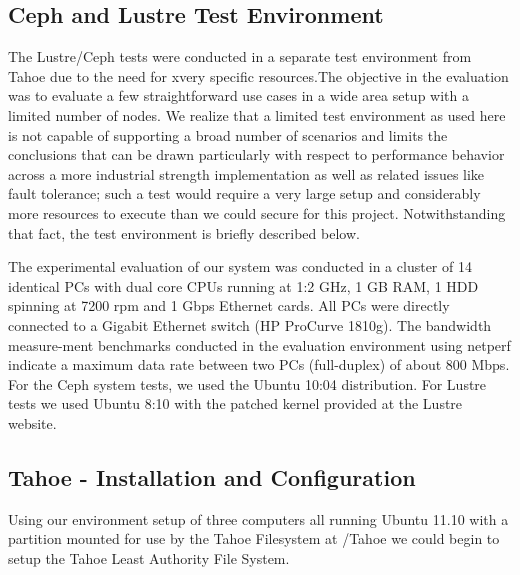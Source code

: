 \documentclass[11pt]{article}
\begin{document}
\subsection{Ceph and Lustre Test Environment}
The Lustre/Ceph tests were conducted in a separate test environment from
Tahoe due to the need for xvery specific resources.The objective in the 
evaluation was to evaluate a few straightforward use cases in a wide area 
setup with a limited number of nodes. We realize that a limited test 
environment as used here is not capable of supporting a broad number of 
scenarios and limits the conclusions that can be drawn particularly with 
respect to performance behavior across a more industrial strength 
implementation as well as related issues like fault tolerance; such a test 
would require a very large setup and considerably more resources to execute 
than we could secure for this project. Notwithstanding that fact, the test 
environment is briefly described below. 

The experimental evaluation of our system was conducted in a cluster of 14 
identical PCs with dual core CPUs running at 1:2 GHz, 1 GB RAM, 1 HDD 
spinning at 7200 rpm and 1 Gbps Ethernet cards. All PCs were directly 
connected to a Gigabit Ethernet switch (HP ProCurve 1810g). The bandwidth 
measure-ment benchmarks conducted in the evaluation environment using netperf 
indicate a maximum data rate between two PCs (full-duplex) of about 800 Mbps. 
For the Ceph system tests, we used the Ubuntu 10:04 distribution. For Lustre 
tests we used Ubuntu 8:10 with the patched kernel provided at the Lustre 
website.

\subsection{Tahoe - Installation and Configuration}

Using our environment setup of three computers all running Ubuntu
11.10 with a partition mounted for use by the Tahoe Filesystem at
/Tahoe we could begin to setup the Tahoe Least Authority File System.
\end{document}
